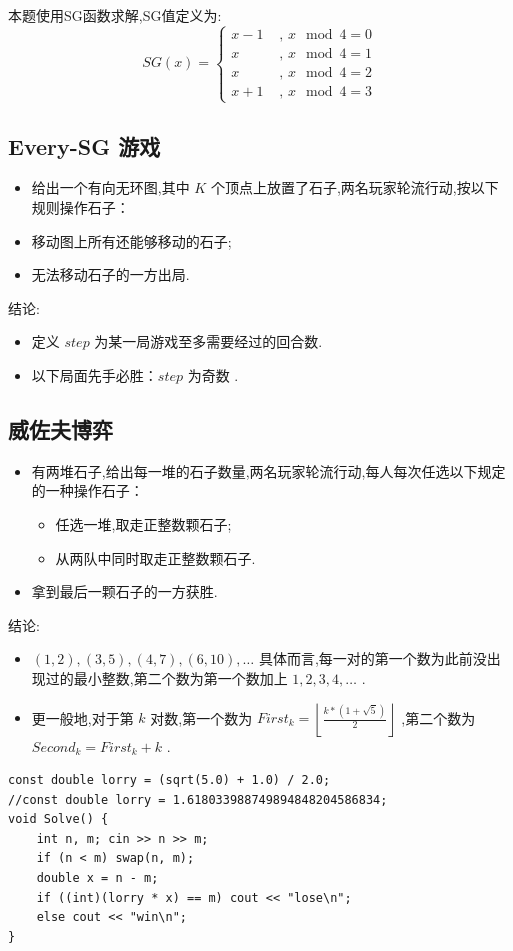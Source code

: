 本题使用SG函数求解,SG值定义为:
$$SG(x) = 
\begin{cases}
x-1 & \text{ , } x\mod 4= 0\\ 
x & \text{ , } x \mod 4 = 1\\ 
x & \text{ , } x \mod 4 = 2\\ 
x+1 & \text{ , } x \mod 4 = 3
\end{cases}$$






\subsection{Every-SG 游戏}
\begin{itemize}
    \item 给出一个有向无环图,其中 $K$ 个顶点上放置了石子,两名玩家轮流行动,按以下规则操作石子：
    \item 移动图上所有还能够移动的石子; 
    \item 无法移动石子的一方出局.
\end{itemize}

结论:
\begin{itemize}
    \item 定义 $step$ 为某一局游戏至多需要经过的回合数.
    \item 以下局面先手必胜：$step$ 为奇数 .
\end{itemize}



\subsection{威佐夫博弈}
\begin{itemize}
\item 有两堆石子,给出每一堆的石子数量,两名玩家轮流行动,每人每次任选以下规定的一种操作石子：
\begin{itemize}
\item 任选一堆,取走正整数颗石子;
\item 从两队中同时取走正整数颗石子.
\end{itemize}
\item 拿到最后一颗石子的一方获胜.
\end{itemize}

结论:
\begin{itemize}
    \item  $(1, 2), (3, 5), (4, 7), (6, 10), …$ 具体而言,每一对的第一个数为此前没出现过的最小整数,第二个数为第一个数加上 $1,2,3,4,…$ .
    \item 更一般地,对于第 $k$ 对数,第一个数为 $First_k= \left \lfloor \frac{k*(1+\sqrt 5)}{2} \right \rfloor$ ,第二个数为 $Second_k=First_k+k$ .
\end{itemize}
\begin{lstlisting}[caption={}]
const double lorry = (sqrt(5.0) + 1.0) / 2.0;
//const double lorry = 1.618033988749894848204586834;
void Solve() {
    int n, m; cin >> n >> m;
    if (n < m) swap(n, m);
    double x = n - m;
    if ((int)(lorry * x) == m) cout << "lose\n";
    else cout << "win\n";
}
\end{lstlisting}





